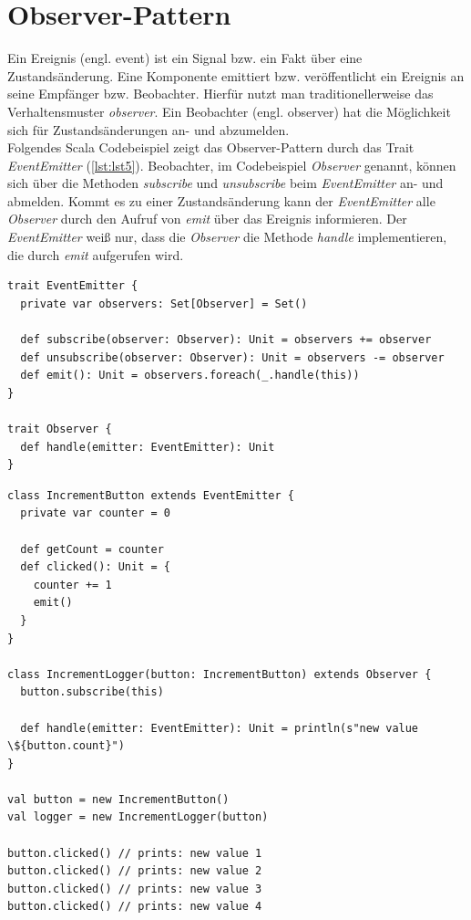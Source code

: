 \section{Observer-Pattern}
Ein Ereignis (engl. event) ist ein Signal bzw. ein Fakt über eine Zustandsänderung. Eine Komponente emittiert bzw. veröffentlicht ein Ereignis an seine Empfänger bzw. Beobachter. Hierfür nutzt man traditionellerweise das Verhaltensmuster \textit{observer}. Ein Beobachter (engl. observer) hat die Möglichkeit sich für Zustandsänderungen an- und abzumelden.\\
Folgendes Scala Codebeispiel zeigt das Observer-Pattern durch das Trait \textit{EventEmitter} (\ref{lst:lst5}). Beobachter, im Codebeispiel \textit{Observer} genannt, können sich über die Methoden \textit{subscribe} und \textit{unsubscribe} beim \textit{EventEmitter} an- und abmelden. Kommt es zu einer Zustandsänderung kann der \textit{EventEmitter} alle \textit{Observer} durch den Aufruf von \textit{emit} über das Ereignis informieren. Der \textit{EventEmitter} weiß nur, dass die \textit{Observer} die Methode \textit{handle} implementieren, die durch \textit{emit} aufgerufen wird.

\begin{lstlisting}[caption={Codebeispiel für das Observer-Pattern.},label={lst:lst5}]
trait EventEmitter {
  private var observers: Set[Observer] = Set()

  def subscribe(observer: Observer): Unit = observers += observer
  def unsubscribe(observer: Observer): Unit = observers -= observer
  def emit(): Unit = observers.foreach(_.handle(this))
}

trait Observer {
  def handle(emitter: EventEmitter): Unit
}
\end{lstlisting}

\pagebreak

\begin{lstlisting}[caption={Codebeispiel für das Observer-Pattern.},label={lst:lst6}]
class IncrementButton extends EventEmitter {
  private var counter = 0

  def getCount = counter
  def clicked(): Unit = {
    counter += 1
    emit()
  }
}

class IncrementLogger(button: IncrementButton) extends Observer {
  button.subscribe(this)

  def handle(emitter: EventEmitter): Unit = println(s"new value \${button.count}")
}

val button = new IncrementButton()
val logger = new IncrementLogger(button)

button.clicked() // prints: new value 1
button.clicked() // prints: new value 2
button.clicked() // prints: new value 3
button.clicked() // prints: new value 4
\end{lstlisting}

